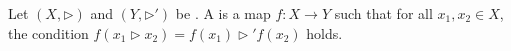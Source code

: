 \begin{definition} \label{definition:homomorphism_of_racks}
Let $(X, \rhd)$ and $(Y, \rhd')$ be . 
A  is a map $f: X \to Y$ such that for all $x_1, x_2 \in X$, the condition $f(x_1 \rhd x_2) = f(x_1) \rhd' f(x_2)$ holds.
\end{definition}